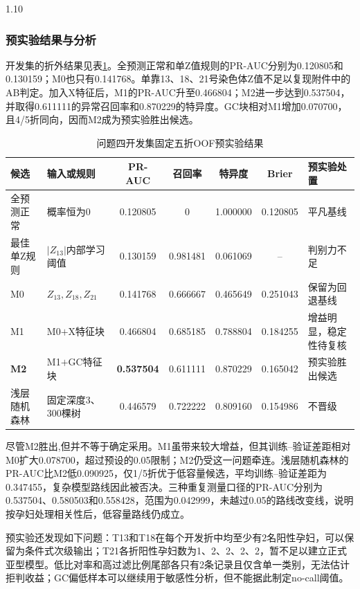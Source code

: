 \documentclass[12pt,a4paper]{ctexrep}
\numberwithin{equation}{section}
\begin{document}
\begin{spacing}{1.10}
{			\subsubsection{预实验结果与分析}
			开发集的折外结果见表\ref{tab:q4_pilot_results}。全预测正常和单Z值规则的PR-AUC分别为0.120805和0.130159；M0也只有0.141768。单靠13、18、21号染色体Z值不足以复现附件中的AB判定。加入X特征后，M1的PR-AUC升至0.466804；M2进一步达到0.537504，并取得0.611111的异常召回率和0.870229的特异度。GC块相对M1增加0.070700，且4/5折同向，因而M2成为预实验胜出候选。

			\begin{table}[H]
			\centering
			\footnotesize
			\renewcommand{\arraystretch}{1.15}
			\caption{问题四开发集固定五折OOF预实验结果}
			\label{tab:q4_pilot_results}
			\begin{tabularx}{\textwidth}{@{}p{}p{}ccccX@{}}
			\toprule
			候选 & 输入或规则 & PR-AUC & 召回率 & 特异度 & Brier & 预实验处置 \\
			\midrule
			全预测正常 & 概率恒为0 & 0.120805 & 0 & 1.000000 & 0.120805 & 平凡基线 \\
			最佳单Z规则 & $|Z_{13}|$内部学习阈值 & 0.130159 & 0.981481 & 0.061069 & -- & 判别力不足 \\
			M0 & $Z_{13},Z_{18},Z_{21}$ & 0.141768 & 0.666667 & 0.465649 & 0.251043 & 保留为回退基线 \\
			M1 & M0$+$X特征块 & 0.466804 & 0.685185 & 0.788804 & 0.184255 & 增益明显，稳定性待复核 \\
			\textbf{M2} & M1$+$GC特征块 & \textbf{0.537504} & 0.611111 & 0.870229 & 0.165042 & 预实验胜出候选 \\
			浅层随机森林 & 固定深度3、300棵树 & 0.446579 & 0.722222 & 0.809160 & 0.154986 & 不晋级 \\
			\bottomrule
			\end{tabularx}
			\end{table}

			尽管M2胜出,但并不等于确定采用。M1虽带来较大增益，但其训练--验证差距相对M0扩大0.078700，超过预设的0.05限制；M2仍受这一问题牵连。浅层随机森林的PR-AUC比M2低0.090925，仅1/5折优于低容量候选，平均训练--验证差距为0.347455，复杂模型路线因此被否决。三种重复测量口径的PR-AUC分别为0.537504、0.580503和0.558428，范围为0.042999，未越过0.05的路线改变线，说明按孕妇处理相关性后，低容量路线仍成立。

			预实验还发现如下问题：T13和T18在每个开发折中均至少有2名阳性孕妇，可以保留为条件式次级输出；T21各折阳性孕妇数为1、2、2、2、2，暂不足以建立正式亚型模型。低比对率和高过滤比例尾部各只有2条记录且仅含单一类别，无法估计拒判收益；GC偏低样本可以继续用于敏感性分析，但不能据此制定no-call阈值。

}
\end{spacing}
\end{document}
